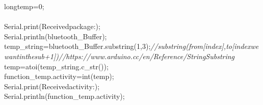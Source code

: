 \documentclass[a4paper, 12pt]{article}
\newcommand\SPC{\hspace*{0.6em}}
\newcommand\QOT{\mbox{\char 34}}
\newcommand{\CppAComment}[1]{\textit{\textcolor[rgb]{0.2,0.4,1}{#1}}}
\newcommand{\CppAIdentifier}[1]{\textcolor[rgb]{0,1,0}{#1}}
\newcommand{\CppANumber}[1]{\textcolor[rgb]{0,0,1}{#1}}
\newcommand{\CppAReservedWord}[1]{\textcolor[rgb]{0,0.5,0}{#1}}
\newcommand{\CppASpace}[1]{\textcolor[rgb]{1,1,1}{\colorbox[rgb]{0,0,0}{#1}}}
\newcommand{\CppAString}[1]{\textcolor[rgb]{0.76,0.76,0.76}{#1}}
\newcommand{\CppASymbol}[1]{\textcolor[rgb]{1,0,0}{#1}}
\begin{document}
\begin{ttfamily}
\CppASpace{\SPC \SPC \SPC \SPC \SPC \SPC \SPC \SPC \SPC \SPC \SPC \SPC \SPC }\CppAReservedWord{long}\CppASpace{\SPC }\CppAIdentifier{temp}\CppASymbol{=}\CppANumber{0}\CppASymbol{;}\\
\\
\CppASpace{\SPC \SPC \SPC \SPC \SPC \SPC \SPC \SPC \SPC \SPC \SPC \SPC \SPC \SPC }\CppAIdentifier{Serial}\CppASymbol{.}\CppAIdentifier{print}\CppASymbol{(}\CppAString{\QOT Received\SPC package\SPC :\SPC \QOT }\CppASymbol{)}\CppASymbol{;}\\
\CppASpace{\SPC \SPC \SPC \SPC \SPC \SPC \SPC \SPC \SPC \SPC \SPC \SPC \SPC \SPC }\CppAIdentifier{Serial}\CppASymbol{.}\CppAIdentifier{println}\CppASymbol{(}\CppAIdentifier{bluetooth\_Buffer}\CppASymbol{)}\CppASymbol{;}\\
\CppASpace{\SPC \SPC \SPC \SPC \SPC \SPC \SPC \SPC \SPC \SPC \SPC \SPC \SPC \SPC }\CppAIdentifier{temp\_string}\CppASymbol{=}\CppAIdentifier{bluetooth\_Buffer}\CppASymbol{.}\CppAIdentifier{substring}\CppASymbol{(}\CppANumber{1}\CppASymbol{,}\CppANumber{3}\CppASymbol{)}\CppASymbol{;}\CppASpace{\SPC }\CppAComment{//\SPC substring\SPC (from\SPC [index]\SPC ,to\SPC [index\SPC we\SPC want\SPC in\SPC the\SPC sub\SPC +1])//\SPC https://www.arduino.cc/en/Reference/StringSubstring}\\
\CppASpace{\SPC \SPC \SPC \SPC \SPC \SPC \SPC \SPC \SPC \SPC \SPC \SPC \SPC \SPC }\CppAIdentifier{temp}\CppASymbol{=}\CppAIdentifier{atoi}\CppASymbol{(}\CppAIdentifier{temp\_string}\CppASymbol{.}\CppAIdentifier{c\_str}\CppASymbol{(}\CppASymbol{)}\CppASymbol{)}\CppASymbol{;}\\
\CppASpace{\SPC \SPC \SPC \SPC \SPC \SPC \SPC \SPC \SPC \SPC \SPC \SPC \SPC \SPC }\CppAIdentifier{function\_temp}\CppASymbol{.}\CppAIdentifier{activity}\CppASpace{\SPC }\CppASymbol{=}\CppASpace{\SPC }\CppAReservedWord{int}\CppASymbol{(}\CppAIdentifier{temp}\CppASymbol{)}\CppASymbol{;}\\
\CppASpace{\SPC \SPC \SPC \SPC \SPC \SPC \SPC \SPC \SPC \SPC \SPC \SPC \SPC \SPC }\CppAIdentifier{Serial}\CppASymbol{.}\CppAIdentifier{print}\CppASymbol{(}\CppAString{\QOT Received\SPC activity\SPC :\SPC \QOT }\CppASymbol{)}\CppASymbol{;}\\
\CppASpace{\SPC \SPC \SPC \SPC \SPC \SPC \SPC \SPC \SPC \SPC \SPC \SPC \SPC \SPC }\CppAIdentifier{Serial}\CppASymbol{.}\CppAIdentifier{println}\CppASymbol{(}\CppAIdentifier{function\_temp}\CppASymbol{.}\CppAIdentifier{activity}\CppASymbol{)}\CppASymbol{;}\\
\CppASpace{\SPC \SPC \SPC \SPC \SPC \SPC \SPC \SPC \SPC \SPC \SPC \SPC \SPC \SPC }\\

\end{ttfamily}
\end{document}
